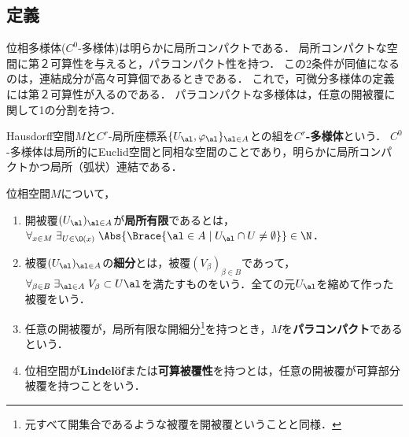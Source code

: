 \documentclass[uplatex,dvipdfmx]{jsreport}
\begin{document}
\subsection{定義}

\begin{tcolorbox}[colframe=ForestGreen, colback=ForestGreen!10!white,breakable,colbacktitle=ForestGreen!40!white,coltitle=black,fonttitle=\bfseries\sffamily,
    title=]
    位相多様体($C^0$-多様体)は明らかに局所コンパクトである．
    局所コンパクトな空間に第２可算性を与えると，パラコンパクト性を持つ．
    この2条件が同値になるのは，連結成分が高々可算個であるときである．
    これで，可微分多様体の定義には第２可算性が入るのである．
    パラコンパクトな多様体は，任意の開被覆に関して1の分割を持つ．
\end{tcolorbox}

\begin{definition}[manifold]
    Hausdorff空間$M$と$C^r$-局所座標系$\{U_\al,\varphi_\al\}_{\al\in A}$との組を\textbf{$C^r$-多様体}という．
    $C^0$-多様体は局所的にEuclid空間と同相な空間のことであり，明らかに局所コンパクトかつ局所（弧状）連結である．
\end{definition}

\begin{definition}
    位相空間$M$について，
    \begin{enumerate}
        \item 開被覆$(U_\al)_{\al\in A}$が\textbf{局所有限}であるとは，$\forall_{x\in M}\;\exists_{U\in\O(x)}\;\Abs{\Brace{\al\in A\mid U_\al\cap U\ne\emptyset}}\in\N$．
        \item 被覆$(U_\al)_{\al\in A}$の\textbf{細分}とは，被覆$(V_\beta)_{\beta\in B}$であって，$\forall_{\beta\in B}\;\exists_{\al\in A}\;V_\beta\subset U\al$を満たすものをいう．全ての元$U_\al$を縮めて作った被覆をいう．
        \item 任意の開被覆が，局所有限な開細分\footnote{元すべて開集合であるような被覆を開被覆ということと同様．}を持つとき，$M$を\textbf{パラコンパクト}であるという．
        \item 位相空間が\textbf{Lindelöf}または\textbf{可算被覆性}を持つとは，任意の開被覆が可算部分被覆を持つことをいう．
    \end{enumerate}
\end{definition}
\end{document}
